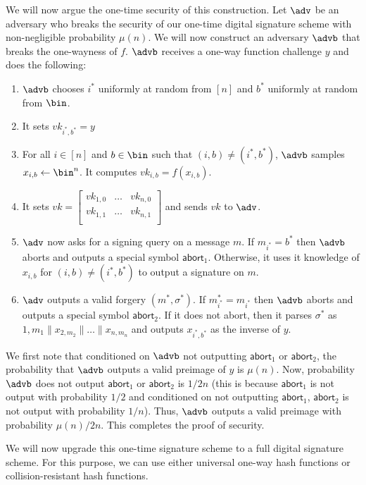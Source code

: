 \documentclass[12pt]{tufte-book}
\newcommand{\abort}{\mathsf{abort}}
\begin{document}
We will now argue the one-time security of this construction. Let $\adv$ be an adversary who breaks the security of our one-time digital signature scheme with non-negligible probability $\mu(n)$. We will now construct an adversary $\advb$ that breaks the one-wayness of $f$. $\advb$ receives a one-way function challenge $y$ and does the following:
\begin{enumerate}
    \item $\advb$ chooses $i^*$ uniformly at random from $[n]$ and $b^*$ uniformly at random from $\bin$.
    \item It sets $vk_{i^*,b^*} = y$
    \item For all $i \in [n]$ and $b \in \bin$ such that $(i,b) \neq (i^*,b^*)$, $\advb$ samples $x_{i,b} \gets \bin^n$. It computes $vk_{i,b} = f(x_{i,b})$.
    \item It sets $vk = \left[ \begin{array}{ccc}
vk_{1,0} & \ldots& vk_{n,0} \\
vk_{1,1} & \ldots& vk_{n,1} \\
\end{array} \right]$ and sends $vk$ to $\adv$.
\item $\adv$ now asks for a signing query on a message $m$. If $m_{i^*} = b^*$ then $\advb$ aborts and outputs a special symbol $\abort_1$. Otherwise, it uses it knowledge of $x_{i,b}$ for $(i,b) \neq (i^*,b^*)$ to output a signature on $m$.
\item $\adv$ outputs a valid forgery $(m^*,\sigma^*)$. If $m^*_{i^*} = m_{i^*}$ then $\advb$ aborts and outputs a special symbol $\abort_2$. If it does not abort, then it parses $\sigma^*$ as ${1,m_1}\|x_{2,m_2}\| \ldots \| x_{n,m_n}$ and outputs $x_{i^*,b^*}$ as the inverse of $y$.
\end{enumerate}
We first note that conditioned on $\advb$ not outputting $\abort_1$ or $\abort_2$, the probability that $\advb$ outputs a valid preimage of $y$ is $\mu(n)$. Now, probability $\advb$ does not output $\abort_1$ or $\abort_2$ is $1/2n$ (this is because $\abort_1$ is not output with probability $1/2$ and conditioned on not outputting $\abort_1$, $\abort_2$ is not output with probability $1/n$). Thus, $\advb$ outputs a valid preimage with probability $\mu(n)/2n$. This completes the proof of security.

We will now upgrade this one-time signature scheme to a full digital signature scheme. For this purpose, we can use either universal one-way hash functions or collision-resistant hash functions.
\end{document}
